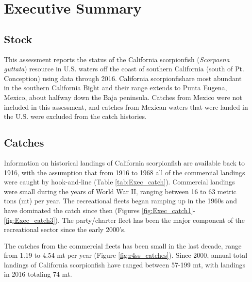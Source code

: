 \documentclass[12pt,]{article}
\begin{document}
{
\setcounter{tocdepth}{4}
\tableofcontents
}
\setlength{\parskip}{5mm plus1mm minus1mm} \pagebreak

 \setcounter{page}{1}
\renewcommand{\thefigure}{\alph{figure}}
\renewcommand{\thetable}{\alph{table}}

\section*{Executive Summary}\label{executive-summary}

\subsection*{Stock}\label{stock}

This assessment reports the status of the California scorpionfish
(\emph{Scorpaena guttata}) resource in U.S. waters off the coast of
southern California (south of Pt. Conception) using data through 2016.
California scorpionfishare most abundant in the southern California
Bight and their range extends to Punta Eugena, Mexico, about halfway
down the Baja peninsula. Catches from Mexico were not included in this
assessment, and catches from Mexican waters that were landed in the U.S.
were excluded from the catch histories.

\subsection*{Catches}\label{catches}

Information on historical landings of California scorpionfish are
available back to 1916, with the assumption that from 1916 to 1968 all
of the commercial landings were caught by hook-and-line (Table
\ref{tab:Exec_catch}). Commercial landings were small during the years
of World War II, ranging between 16 to 63 metric tons (mt) per year. The
recreational fleets began ramping up in the 1960s and have dominated the
catch since then (Figures \ref{fig:Exec_catch1}-\ref{fig:Exec_catch3}).
The party/charter fleet has been the major component of the recreational
sector since the early 2000's.

The catches from the commercial fleets has been small in the last
decade, range from 1.19 to 4.54 mt per year (Figure
\ref{fig:r4ss_catches}). Since 2000, annual total landings of California
scorpionfish have ranged between 57-199 mt, with landings in 2016
totaling 74 mt.
\end{document}
